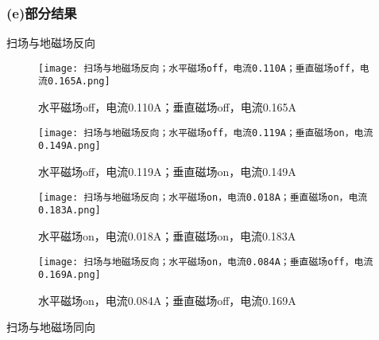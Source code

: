 \subsubsection{(e)部分结果}



扫场与地磁场反向

\begin{figure}[H]
    \centering
    \begin{minipage}{0.45\textwidth}
        \texttt{[image: 扫场与地磁场反向；水平磁场off，电流0.110A；垂直磁场off，电流0.165A.png]}
        \caption{水平磁场off，电流0.110A；垂直磁场off，电流0.165A}
        \label{fig:img1}
    \end{minipage}%
         \hfill
    \begin{minipage}{0.45\textwidth}
        \texttt{[image: 扫场与地磁场反向；水平磁场off，电流0.119A；垂直磁场on，电流0.149A.png]}
        \caption{水平磁场off，电流0.119A；垂直磁场on，电流0.149A}
        \label{fig:img2}
    \end{minipage}
\end{figure}

\begin{figure}[H]
    \centering
    \begin{minipage}{0.45\textwidth}
        \texttt{[image: 扫场与地磁场反向；水平磁场on，电流0.018A；垂直磁场on，电流0.183A.png]}
        \caption{水平磁场on，电流0.018A；垂直磁场on，电流0.183A}
        \label{fig:img3}
    \end{minipage}%
         \hfill
    \begin{minipage}{0.45\textwidth}
        \texttt{[image: 扫场与地磁场反向；水平磁场on，电流0.084A；垂直磁场off，电流0.169A.png]}
        \caption{水平磁场on，电流0.084A；垂直磁场off，电流0.169A}
        \label{fig:img4}
    \end{minipage}
\end{figure}

扫场与地磁场同向

